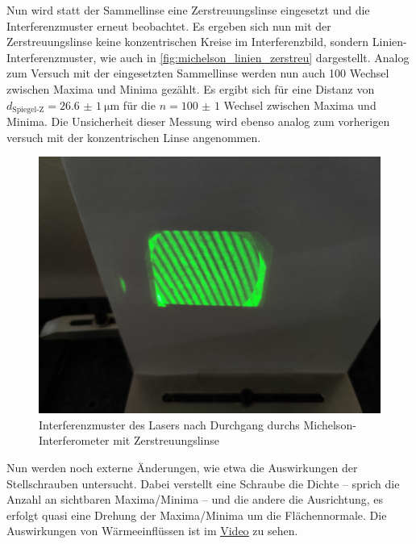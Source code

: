\documentclass[ngerman]{scrartcl}
\begin{document}
Nun wird statt der Sammellinse eine Zerstreuungslinse eingesetzt und die Interferenzmuster erneut beobachtet. Es ergeben sich nun mit der Zerstreuungslinse keine konzentrischen Kreise im Interferenzbild, sondern Linien-Interferenzmuster, wie auch in \autoref{fig:michelson_linien_zerstreu} dargestellt.
Analog zum Versuch mit der eingesetzten Sammellinse werden nun auch 100 Wechsel zwischen Maxima und Minima gezählt. Es ergibt sich für eine Distanz von $d_\text{Spiegel-Z} = \SI{26.6(10)}{\micro\meter}$ für die $n = \num{100(1)}$ Wechsel zwischen Maxima und Minima. Die Unsicherheit dieser Messung wird ebenso analog zum vorherigen versuch mit der konzentrischen Linse angenommen.
%
\begin{figure}[H]
    \centering
    \begin{samepage}
        \includegraphics[width=0.7\linewidth]{fig/Compressed/Zerstreuungslinse.jpg}
        \caption[Interferenzmuster Michelson-Interferometer Zerstreuungslinse]{Interferenzmuster des Lasers nach Durchgang durchs Michelson-Interferometer mit Zerstreuungslinse}
        \label{fig:michelson_linien_zerstreu}
    \end{samepage}
\end{figure}
%
Nun werden noch externe Änderungen, wie etwa die Auswirkungen der Stellschrauben untersucht. Dabei verstellt eine Schraube die Dichte -- sprich die Anzahl an sichtbaren Maxima/Minima -- und die andere die Ausrichtung, es erfolgt quasi eine Drehung der Maxima/Minima um die Flächennormale.
Die Auswirkungen von Wärmeeinflüssen ist im \underline{\href{https://etschgi1.github.io/files/UNI_hosting/Misc/FP2/Interferometrie/Stoerungen.mp4}{Video}} zu sehen.
\end{document}
